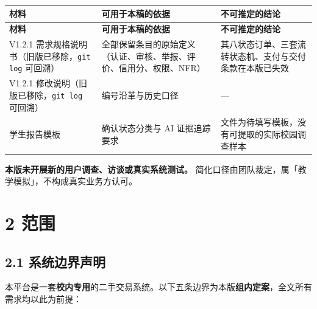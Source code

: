 \documentclass[12pt,a4paper]{ctexart}
\begin{document}
{\footnotesize
\begin{longtable}{|p{4.87cm}|p{5.92cm}|p{5.21cm}|}
\hline
\textbf{材料} & \textbf{可用于本稿的依据} & \textbf{不可推定的结论} \\
\hline
\endfirsthead
\hline
\textbf{材料} & \textbf{可用于本稿的依据} & \textbf{不可推定的结论} \\
\hline
\endhead
\hline
\endfoot
V1.2.1 需求规格说明书（旧版已移除，\texttt{git log} 可回溯） & 全部保留条目的原始定义（认证、审核、举报、评价、信用分、权限、NFR） & 其八状态订单、三套流转状态机、支付与交付条款在本版已失效 \\
\hline
V1.2.1 修改说明（旧版已移除，\texttt{git log} 可回溯） & 编号沿革与历史口径 & — \\
\hline
学生报告模板 & 确认状态分类与 AI 证据追踪要求 & 文件为待填写模板，没有可提取的实际校园调查样本 \\
\hline
\end{longtable}
}


\textbf{本版未开展新的用户调查、访谈或真实系统测试。} 简化口径由团队裁定，属「教学模拟」，不构成真实业务方认可。



\section*{2 范围}

\subsection*{2.1 系统边界声明}

本平台是一套\textbf{校内专用}的二手交易系统。以下五条边界为本版\textbf{组内定案}，全文所有需求均以此为前提：
\end{document}
